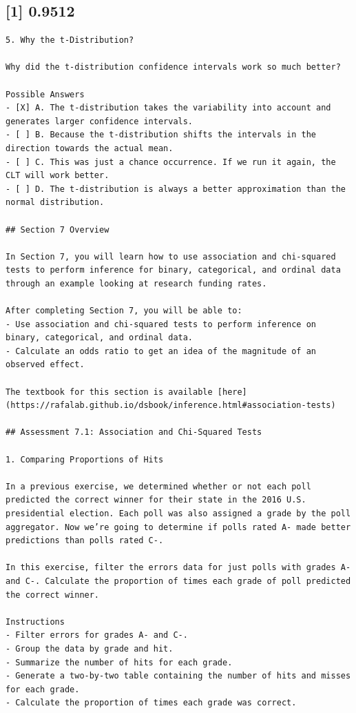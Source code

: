 \documentclass[
]{article}
\begin{document}
\hypertarget{section-3}{%
\subsection{{[}1{]} 0.9512}\label{section-3}}

\begin{verbatim}
5. Why the t-Distribution?

Why did the t-distribution confidence intervals work so much better?

Possible Answers
- [X] A. The t-distribution takes the variability into account and generates larger confidence intervals. 
- [ ] B. Because the t-distribution shifts the intervals in the direction towards the actual mean. 
- [ ] C. This was just a chance occurrence. If we run it again, the CLT will work better. 
- [ ] D. The t-distribution is always a better approximation than the normal distribution.

## Section 7 Overview

In Section 7, you will learn how to use association and chi-squared tests to perform inference for binary, categorical, and ordinal data through an example looking at research funding rates.

After completing Section 7, you will be able to:
- Use association and chi-squared tests to perform inference on binary, categorical, and ordinal data.
- Calculate an odds ratio to get an idea of the magnitude of an observed effect.

The textbook for this section is available [here](https://rafalab.github.io/dsbook/inference.html#association-tests)

## Assessment 7.1: Association and Chi-Squared Tests

1. Comparing Proportions of Hits

In a previous exercise, we determined whether or not each poll predicted the correct winner for their state in the 2016 U.S. presidential election. Each poll was also assigned a grade by the poll aggregator. Now we’re going to determine if polls rated A- made better predictions than polls rated C-.

In this exercise, filter the errors data for just polls with grades A- and C-. Calculate the proportion of times each grade of poll predicted the correct winner.

Instructions
- Filter errors for grades A- and C-.
- Group the data by grade and hit.
- Summarize the number of hits for each grade.
- Generate a two-by-two table containing the number of hits and misses for each grade.
- Calculate the proportion of times each grade was correct.
\end{verbatim}
\end{document}

